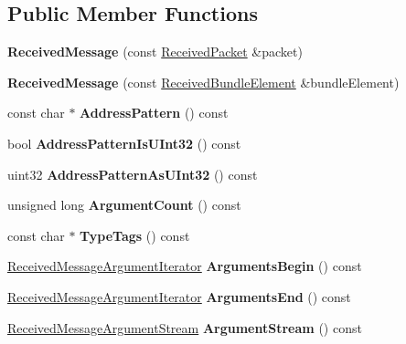 \subsection*{Public Member Functions}
\begin{DoxyCompactItemize}
\item 
\mbox{\label{classosc_1_1_received_message_a889cfd488244fc499d9ed57233720641}} 
{\bfseries Received\+Message} (const \hyperlink{classosc_1_1_received_packet}{Received\+Packet} \&packet)
\item 
\mbox{\label{classosc_1_1_received_message_ace5dd16aef750881c2ab595f859b1092}} 
{\bfseries Received\+Message} (const \hyperlink{classosc_1_1_received_bundle_element}{Received\+Bundle\+Element} \&bundle\+Element)
\item 
\mbox{\label{classosc_1_1_received_message_a71bada77319008ee9e28acee28b6ba18}} 
const char $\ast$ {\bfseries Address\+Pattern} () const
\item 
\mbox{\label{classosc_1_1_received_message_a0f0f8febf3fc06bb578ccaf0b7d0274b}} 
bool {\bfseries Address\+Pattern\+Is\+U\+Int32} () const
\item 
\mbox{\label{classosc_1_1_received_message_aca5af85b91036cdb9bc76535918fe172}} 
uint32 {\bfseries Address\+Pattern\+As\+U\+Int32} () const
\item 
\mbox{\label{classosc_1_1_received_message_a03ec2ac13d91cad7ee3574d61f9225cc}} 
unsigned long {\bfseries Argument\+Count} () const
\item 
\mbox{\label{classosc_1_1_received_message_a003dd29180539cc5e9d723ca53b3ce48}} 
const char $\ast$ {\bfseries Type\+Tags} () const
\item 
\mbox{\label{classosc_1_1_received_message_a3637e2a9c27c3de202034ebbedcd672c}} 
\hyperlink{classosc_1_1_received_message_argument_iterator}{Received\+Message\+Argument\+Iterator} {\bfseries Arguments\+Begin} () const
\item 
\mbox{\label{classosc_1_1_received_message_ac57e26789335781fc68c3ac7b23deb24}} 
\hyperlink{classosc_1_1_received_message_argument_iterator}{Received\+Message\+Argument\+Iterator} {\bfseries Arguments\+End} () const
\item 
\mbox{\label{classosc_1_1_received_message_a77c64e2381f46add54e2c9d5c13827e7}} 
\hyperlink{classosc_1_1_received_message_argument_stream}{Received\+Message\+Argument\+Stream} {\bfseries Argument\+Stream} () const
\end{DoxyCompactItemize}


